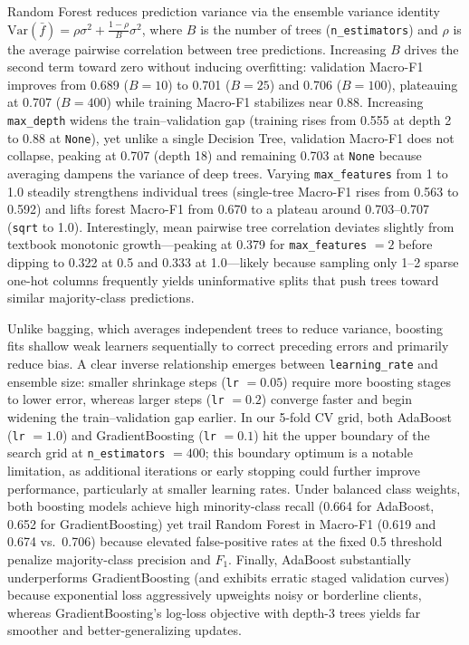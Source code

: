 Random Forest reduces prediction variance via the ensemble variance identity $\text{Var}(\bar{f}) = \rho\sigma^2 + \frac{1-\rho}{B}\sigma^2$, where $B$ is the number of trees (\texttt{n\_estimators}) and $\rho$ is the average pairwise correlation between tree predictions. Increasing $B$ drives the second term toward zero without inducing overfitting: validation Macro-F1 improves from 0.689 ($B=10$) to 0.701 ($B=25$) and 0.706 ($B=100$), plateauing at 0.707 ($B=400$) while training Macro-F1 stabilizes near 0.88. Increasing \texttt{max\_depth} widens the train--validation gap (training rises from 0.555 at depth 2 to 0.88 at \texttt{None}), yet unlike a single Decision Tree, validation Macro-F1 does not collapse, peaking at 0.707 (depth 18) and remaining 0.703 at \texttt{None} because averaging dampens the variance of deep trees. Varying \texttt{max\_features} from 1 to 1.0 steadily strengthens individual trees (single-tree Macro-F1 rises from 0.563 to 0.592) and lifts forest Macro-F1 from 0.670 to a plateau around 0.703--0.707 (\texttt{sqrt} to 1.0). Interestingly, mean pairwise tree correlation deviates slightly from textbook monotonic growth---peaking at 0.379 for \texttt{max\_features} $= 2$ before dipping to 0.322 at 0.5 and 0.333 at 1.0---likely because sampling only 1--2 sparse one-hot columns frequently yields uninformative splits that push trees toward similar majority-class predictions.


Unlike bagging, which averages independent trees to reduce variance, boosting fits shallow weak learners sequentially to correct preceding errors and primarily reduce bias. A clear inverse relationship emerges between \texttt{learning\_rate} and ensemble size: smaller shrinkage steps (\texttt{lr} $= 0.05$) require more boosting stages to lower error, whereas larger steps (\texttt{lr} $= 0.2$) converge faster and begin widening the train--validation gap earlier. In our 5-fold CV grid, both AdaBoost (\texttt{lr} $= 1.0$) and GradientBoosting (\texttt{lr} $= 0.1$) hit the upper boundary of the search grid at \texttt{n\_estimators} $= 400$; this boundary optimum is a notable limitation, as additional iterations or early stopping could further improve performance, particularly at smaller learning rates. Under balanced class weights, both boosting models achieve high minority-class recall (0.664 for AdaBoost, 0.652 for GradientBoosting) yet trail Random Forest in Macro-F1 (0.619 and 0.674 vs.\ 0.706) because elevated false-positive rates at the fixed 0.5 threshold penalize majority-class precision and $F_1$. Finally, AdaBoost substantially underperforms GradientBoosting (and exhibits erratic staged validation curves) because exponential loss aggressively upweights noisy or borderline clients, whereas GradientBoosting's log-loss objective with depth-3 trees yields far smoother and better-generalizing updates.


